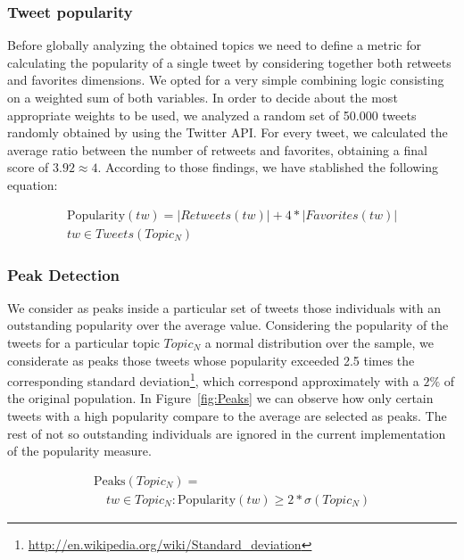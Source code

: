 \documentclass{sig-alternate}
\begin{document}
\subsubsection{Tweet popularity}

Before globally analyzing the obtained topics we need to define a metric for calculating the popularity of a single tweet by considering together both retweets and favorites dimensions. We opted for a very simple combining logic consisting on a weighted sum of both variables. In order to decide about the most appropriate weights to be used, we analyzed a random set of 50.000 tweets randomly obtained by using the Twitter API. For every tweet, we calculated the average ratio between the number of retweets and favorites, obtaining a final score of $3.92 \approx 4$. According to those findings, we have stablished the following equation:

\begin{equation}
\begin{split}
\text{Popularity}(tw) = \left |Retweets(tw)  \right | + 4*\left |Favorites(tw)  \right | \\
tw \in Tweets(Topic_N)
\end{split}
\end{equation}

\subsubsection{Peak Detection}

We consider as peaks inside a particular set of tweets those individuals with an outstanding popularity over the average value. Considering the popularity of the tweets for a particular topic $Topic_N$ a normal distribution over the sample, we considerate as peaks those tweets whose popularity exceeded 2.5 times the corresponding standard deviation\footnote{\fontsize{8pt}{1em}\selectfont \url{http://en.wikipedia.org/wiki/Standard_deviation}}, which correspond approximately with a $2\%$ of the original population. In Figure~\ref{fig:Peaks} we can observe how only certain tweets with a high popularity compare to the average are selected as peaks. The rest of not so outstanding individuals are ignored in the current implementation of the popularity measure.

\begin{equation}
\begin{split}
\text{Peaks}(Topic_N) = \\
 \quad tw \in Topic_N : \text{Popularity}(tw) \geq 2*\sigma (Topic_N)
\end{split}
\end{equation}
\end{document}
